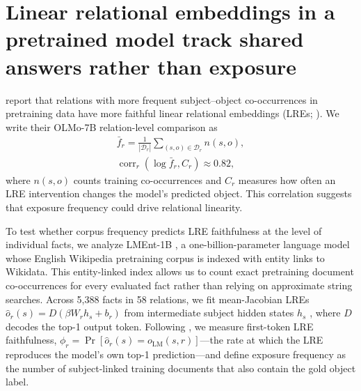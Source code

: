 \section{Linear relational embeddings in a pretrained model track shared answers rather than exposure}
\label{sec:lment-frequency}

\citet{merullo2025frequency} report that relations with more frequent
subject--object co-occurrences in pretraining data have more faithful linear
relational embeddings (LREs;
\citealp{hernandez2024linearity}). We write their
OLMo-7B relation-level comparison as
\begin{equation}
  \begin{gathered}
    \bar f_r=\frac{1}{|\mathcal D_r|}\sum_{(s,o)\in\mathcal D_r}n(s,o), \\
    \operatorname{corr}_r(\log\bar f_r,C_r)\approx0.82,
  \end{gathered}
  \label{eq:merullo-frequency}
\end{equation}
where $n(s,o)$ counts training co-occurrences and $C_r$ measures how often an
LRE intervention changes the model's predicted object. This correlation suggests
that exposure frequency could drive relational linearity.

To test whether corpus frequency predicts LRE faithfulness at the level of
individual facts, we analyze LMEnt-1B \citep{gottesman2025lment}, a
one-billion-parameter language model whose English Wikipedia pretraining corpus
is indexed with entity links to Wikidata. This entity-linked index allows us to
count exact pretraining document co-occurrences for every evaluated fact rather
than relying on approximate string searches. Across 5,388 facts in 58 relations,
we fit mean-Jacobian LREs $\hat o_r(s)=D(\beta W_r h_s+b_r)$ from intermediate
subject hidden states $h_s$ \citep{hernandez2024linearity}, where $D$ decodes
the top-1 output token. Following \citet{hernandez2024linearity}, we measure
first-token LRE faithfulness, $\phi_r=\Pr[\hat o_r(s)=o_{\mathrm{LM}}(s,r)]$---the
rate at which the LRE reproduces the model's own top-1 prediction---and define
exposure frequency as the number of subject-linked training documents that also
contain the gold object label.

